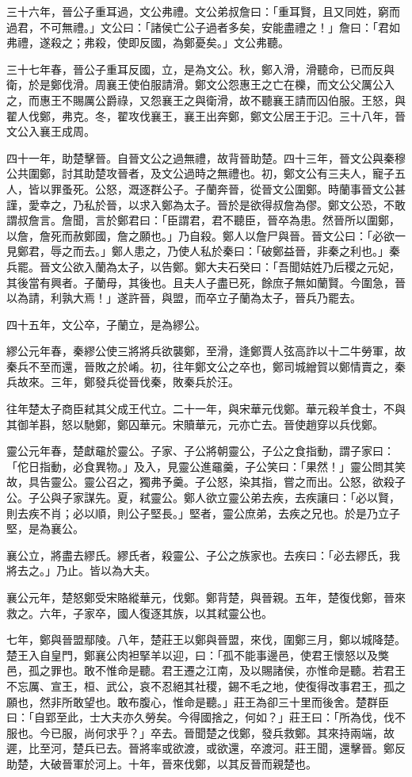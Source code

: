 \begin{pinyinscope}
三十六年，晉公子重耳過，文公弗禮。文公弟叔詹曰：「重耳賢，且又同姓，窮而過君，不可無禮。」文公曰：「諸侯亡公子過者多矣，安能盡禮之！」詹曰：「君如弗禮，遂殺之；弗殺，使即反國，為鄭憂矣。」文公弗聽。

三十七年春，晉公子重耳反國，立，是為文公。秋，鄭入滑，滑聽命，已而反與衛，於是鄭伐滑。周襄王使伯服請滑。鄭文公怨惠王之亡在櫟，而文公父厲公入之，而惠王不賜厲公爵祿，又怨襄王之與衛滑，故不聽襄王請而囚伯服。王怒，與翟人伐鄭，弗克。冬，翟攻伐襄王，襄王出奔鄭，鄭文公居王于氾。三十八年，晉文公入襄王成周。

四十一年，助楚擊晉。自晉文公之過無禮，故背晉助楚。四十三年，晉文公與秦穆公共圍鄭，討其助楚攻晉者，及文公過時之無禮也。初，鄭文公有三夫人，寵子五人，皆以罪蚤死。公怒，溉逐群公子。子蘭奔晉，從晉文公圍鄭。時蘭事晉文公甚謹，愛幸之，乃私於晉，以求入鄭為太子。晉於是欲得叔詹為僇。鄭文公恐，不敢謂叔詹言。詹聞，言於鄭君曰：「臣謂君，君不聽臣，晉卒為患。然晉所以圍鄭，以詹，詹死而赦鄭國，詹之願也。」乃自殺。鄭人以詹尸與晉。晉文公曰：「必欲一見鄭君，辱之而去。」鄭人患之，乃使人私於秦曰：「破鄭益晉，非秦之利也。」秦兵罷。晉文公欲入蘭為太子，以告鄭。鄭大夫石癸曰：「吾聞姞姓乃后稷之元妃，其後當有興者。子蘭母，其後也。且夫人子盡已死，餘庶子無如蘭賢。今圍急，晉以為請，利孰大焉！」遂許晉，與盟，而卒立子蘭為太子，晉兵乃罷去。

四十五年，文公卒，子蘭立，是為繆公。

繆公元年春，秦繆公使三將將兵欲襲鄭，至滑，逢鄭賈人弦高詐以十二牛勞軍，故秦兵不至而還，晉敗之於崤。初，往年鄭文公之卒也，鄭司城繒賀以鄭情賣之，秦兵故來。三年，鄭發兵從晉伐秦，敗秦兵於汪。

往年楚太子商臣弒其父成王代立。二十一年，與宋華元伐鄭。華元殺羊食士，不與其御羊斟，怒以馳鄭，鄭囚華元。宋贖華元，元亦亡去。晉使趙穿以兵伐鄭。

靈公元年春，楚獻黿於靈公。子家、子公將朝靈公，子公之食指動，謂子家曰：「佗日指動，必食異物。」及入，見靈公進黿羹，子公笑曰：「果然！」靈公問其笑故，具告靈公。靈公召之，獨弗予羹。子公怒，染其指，嘗之而出。公怒，欲殺子公。子公與子家謀先。夏，弒靈公。鄭人欲立靈公弟去疾，去疾讓曰：「必以賢，則去疾不肖；必以順，則公子堅長。」堅者，靈公庶弟，去疾之兄也。於是乃立子堅，是為襄公。

襄公立，將盡去繆氏。繆氏者，殺靈公、子公之族家也。去疾曰：「必去繆氏，我將去之。」乃止。皆以為大夫。

襄公元年，楚怒鄭受宋賂縱華元，伐鄭。鄭背楚，與晉親。五年，楚復伐鄭，晉來救之。六年，子家卒，國人復逐其族，以其弒靈公也。

七年，鄭與晉盟鄢陵。八年，楚莊王以鄭與晉盟，來伐，圍鄭三月，鄭以城降楚。楚王入自皇門，鄭襄公肉袒掔羊以迎，曰：「孤不能事邊邑，使君王懷怒以及獘邑，孤之罪也。敢不惟命是聽。君王遷之江南，及以賜諸侯，亦惟命是聽。若君王不忘厲、宣王，桓、武公，哀不忍絕其社稷，錫不毛之地，使復得改事君王，孤之願也，然非所敢望也。敢布腹心，惟命是聽。」莊王為卻三十里而後舍。楚群臣曰：「自郢至此，士大夫亦久勞矣。今得國捨之，何如？」莊王曰：「所為伐，伐不服也。今已服，尚何求乎？」卒去。晉聞楚之伐鄭，發兵救鄭。其來持兩端，故遲，比至河，楚兵已去。晉將率或欲渡，或欲還，卒渡河。莊王聞，還擊晉。鄭反助楚，大破晉軍於河上。十年，晉來伐鄭，以其反晉而親楚也。


\end{pinyinscope}
